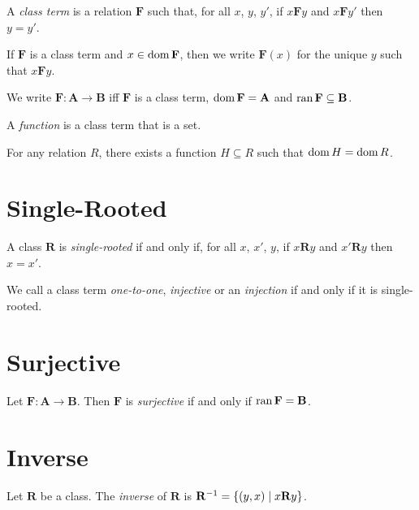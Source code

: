 \begin{definition}
    A \emph{class term} is a relation $\mathbf{F}$ such that, for all $x$, $y$,
    $y'$, if $x\mathbf{F}y$ and $x\mathbf{F}y'$ then $y = y'$.

    If $\mathbf{F}$ is a class term and $x \in \operatorname{dom} \mathbf{F}$, then we write
    $\mathbf{F}(x)$ for the unique $y$ such that $x \mathbf{F} y$.

    We write $\mathbf{F} : \mathbf{A} \rightarrow \mathbf{B}$ iff $\mathbf{F}$ is a class term,
    $\operatorname{dom} \mathbf{F} = \mathbf{A}$ and $\operatorname{ran} \mathbf{F} \subseteq \mathbf{B}$.

    A \emph{function} is a class term that is a set.
\end{definition}

\begin{axiom}
    For any relation $R$, there exists a function $H \subseteq R$ such that 
    $\operatorname{dom} H = \operatorname{dom} R$.
\end{axiom}

\section{Single-Rooted}

\begin{definition}
    A class $\mathbf{R}$ is \emph{single-rooted} if and only if, for all $x$, $x'$, $y$, if $x\mathbf{R}y$ and $x'\mathbf{R}y$ then $x = x'$.

    We call a class term \emph{one-to-one}, \emph{injective} or an \emph{injection}
     if and only if it is single-rooted.
\end{definition}

\section{Surjective}

\begin{definition}
    Let $\mathbf{F} : \mathbf{A} \rightarrow \mathbf{B}$. Then $\mathbf{F}$ is \emph{surjective} if and only if
    $\operatorname{ran} \mathbf{F} = \mathbf{B}$.
\end{definition}

\section{Inverse}

\begin{definition}
    Let $\mathbf{R}$ be a class. The \emph{inverse} of $\mathbf{R}$ is 
    ${\mathbf{R}}^{-1} = \{ (y,x) \mid x \mathbf{R} y \}$.
\end{definition}

